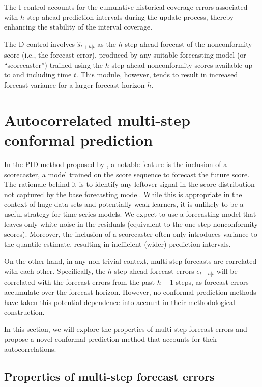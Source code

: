 \documentclass[
  11pt,
  a4paper,
]{article}
\theoremstyle{plain}
\theoremstyle{remark}
\begin{document}
The I control accounts for the cumulative historical coverage errors
associated with \(h\)-step-ahead prediction intervals during the update
process, thereby enhancing the stability of the interval coverage.

The D control involves \(\hat{s}_{t+h|t}\) as the \(h\)-step-ahead
forecast of the nonconformity score (i.e., the forecast error), produced
by any suitable forecasting model (or ``scorecaster'') trained using the
\(h\)-step-ahead nonconformity scores available up to and including time
\(t\). This module, however, tends to result in increased forecast
variance for a larger forecast horizon
\(h\).

\section{Autocorrelated multi-step conformal
prediction}\label{sec-acmcp}

In the PID method proposed by \textcite{angelopoulos2024}, a notable
feature is the inclusion of a scorecaster, a model trained on the score
sequence to forecast the future score. The rationale behind it is to
identify any leftover signal in the score distribution not captured by
the base forecasting model. While this is appropriate in the context of
huge data sets and potentially weak learners, it is unlikely to be a
useful strategy for time series models. We expect to use a forecasting
model that leaves only white noise in the residuals (equivalent to the
one-step nonconformity scores). Moreover, the inclusion of a scorecaster
often only introduces variance to the quantile estimate, resulting in
inefficient (wider) prediction intervals.

On the other hand, in any non-trivial context, multi-step forecasts are
correlated with each other. Specifically, the \(h\)-step-ahead forecast
errors \(e_{t+h|t}\) will be correlated with the forecast errors from
the past \(h-1\) steps, as forecast errors accumulate over the forecast
horizon. However, no conformal prediction methods have taken this
potential dependence into account in their methodological construction.

In this section, we will explore the properties of multi-step forecast
errors and propose a novel conformal prediction method that accounts for
their autocorrelations.

\subsection{Properties of multi-step forecast errors}\label{sec-ppt}
\end{document}
